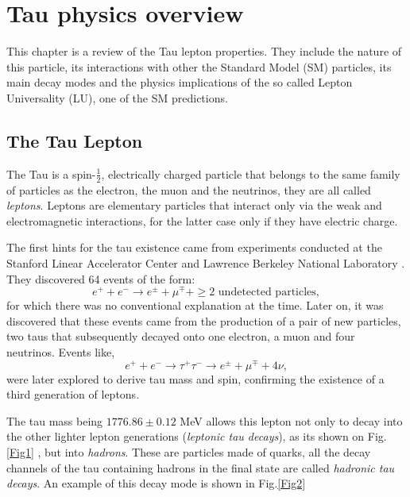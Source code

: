 \chapter{Tau physics overview}\label{chap:relatedwork}
This chapter is a review of the Tau lepton properties. They include the nature of this particle, its interactions with other the Standard Model (SM) particles, its main decay modes and the physics implications of the so called Lepton Universality (LU), one of the SM predictions.  

\section{The Tau Lepton}
The Tau is a spin-$\frac{1}{2}$, electrically charged particle that belongs to the same family of particles as the electron, the muon and the neutrinos, they are all called \textit{leptons}. Leptons are elementary particles that interact only via the weak and electromagnetic interactions, for the latter case only if they have electric charge.  

The first hints for the tau existence came from experiments conducted at the Stanford Linear Accelerator Center and Lawrence Berkeley National Laboratory \cite{PhysRevLett.35.1489}. They discovered 64 events of the form:
\begin{equation}
	e^+ + e^- \to e^\pm + \mu^\mp + \geq \text{2 undetected particles},
\end{equation}
for which there was no conventional explanation at the time. Later on, it was discovered that these events came from the production of a pair of new particles, two taus that subsequently decayed onto one electron, a muon and four neutrinos. Events like,
\begin{equation}
e^+ + e^- \to \tau^+ \tau^- \to e^\pm + \mu^\mp + 4\nu,
\end{equation}	
were later explored to derive tau mass and spin, confirming the existence of a third generation of leptons. 

The tau mass being $1776.86 \pm 0.12$ MeV allows this lepton not only to decay into the other lighter lepton generations (\textit{leptonic tau decays}), as its shown on Fig.\ref{Fig1}  , but into \textit{hadrons}. These are particles made of quarks, all the decay channels of the tau containing hadrons in the final state are called \textit{hadronic tau decays}. An example of this decay mode is shown in Fig.\ref{Fig2}

